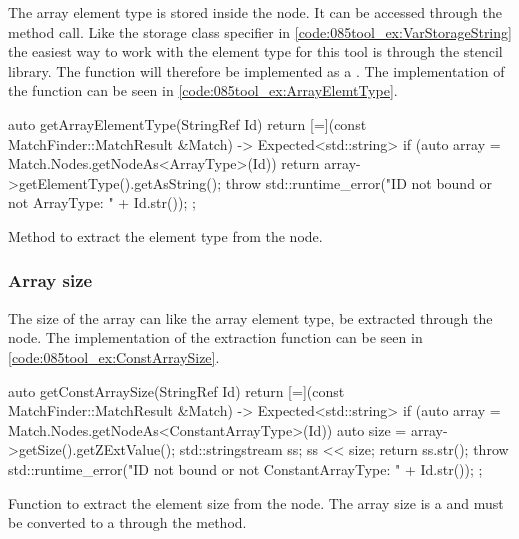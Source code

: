 The array element type is stored inside the  node. It can be accessed through the  method call. Like the storage class specifier in \cref{code:085tool_ex:VarStorageString} the easiest way to work with the element type for this tool is through the stencil library. The  function will therefore be implemented as a . The implementation of the function can be seen in \cref{code:085tool_ex:ArrayElemtType}. 

\begin{listing}[H]
    \begin{cppcode}
auto getArrayElementType(StringRef Id) {
    return [=](const MatchFinder::MatchResult &Match) -> Expected<std::string> {
        if (auto array = Match.Nodes.getNodeAs<ArrayType>(Id)) {
            return array->getElementType().getAsString();
        }
        throw std::runtime_error("ID not bound or not ArrayType: " + Id.str());
    };
}
    \end{cppcode}
    \caption{Method to extract the element type from the  node.}
    \label{code:085tool_ex:ArrayElemtType}
\end{listing}

\subsubsection*{Array size}

The size of the array can like the array element type, be extracted through the  node. The implementation of the extraction function can be seen in \cref{code:085tool_ex:ConstArraySize}.

\begin{listing}[H]
    \begin{cppcode}
auto getConstArraySize(StringRef Id) {
    return [=](const MatchFinder::MatchResult &Match) -> Expected<std::string> {
        if (auto array = Match.Nodes.getNodeAs<ConstantArrayType>(Id)) {
            auto size = array->getSize().getZExtValue();
            std::stringstream ss;
            ss << size;
            return ss.str();
        }
        throw std::runtime_error("ID not bound or not ConstantArrayType: " + Id.str());
    };
}
    \end{cppcode}
    \caption{Function to extract the element size from the  node. The array size is a  and must be converted to a  through the  method.}
    \label{code:085tool_ex:ConstArraySize}
\end{listing}

